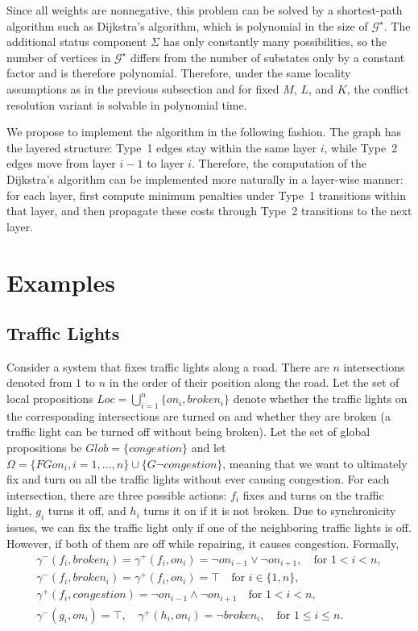 \documentclass[]{jair}
\begin{document}
Since all weights are nonnegative, this problem can be solved by a shortest-path
algorithm such as Dijkstra's algorithm, which is polynomial in the size of $\mathcal{G}^{\star}$. 
The additional status component $\Sigma$ has only constantly many possibilities, so the number of vertices in $\mathcal{G}^{\star}$ differs from the number of substates only by a constant factor and is therefore polynomial.
Therefore, under the same locality assumptions as in the previous subsection and for fixed $M$, $L$, and
$K$, the conflict resolution variant is solvable in polynomial time.

We propose to implement the algorithm in the following fashion.
The graph has the layered structure: Type~1 edges stay within the same layer $i$, while Type~2 edges move
from layer $i-1$ to layer $i$. Therefore, the computation of the Dijkstra's algorithm can be implemented more
naturally in a layer-wise manner: for each layer, first compute minimum penalties under
Type~1 transitions within that layer, and then propagate these costs through Type~2 transitions
to the next layer.

\section{Examples}\label{example}

\subsection{Traffic Lights}\label{ex1}

Consider a system that fixes traffic lights along a road. There are $n$ intersections denoted from $1$ to $n$ in the order of their position along the road. Let the set of local propositions
$Loc=\bigcup_{i=1}^n\{on_i, broken_i\}$ denote whether the traffic lights on the corresponding
intersections are turned on and whether they are broken (a traffic light can be turned off without being broken). Let the set of global propositions be $Glob=\{congestion\}$ and let $\Omega=\{FGon_i, i=1,\dots,n\}\cup\{G\neg congestion\}$, meaning that we want to ultimately
fix and turn on all the traffic lights without ever causing congestion. For each intersection, there are three possible actions: $f_i$ fixes and turns on the traffic light, $g_i$ turns it off, and $h_i$ turns it on if it is not broken. Due to synchronicity issues, we can fix the traffic light only if one of the neighboring traffic lights is off. However, if both of them are off while repairing, it causes congestion. Formally,
\begin{multline}\gamma^-(f_i, broken_i)=\gamma^+(f_i, on_i)=\neg on_{i-1}\lor \neg on_{i+1}, \quad \textrm{for } 1<i<n, \\
\gamma^-(f_i, broken_i)=\gamma^+(f_i, on_i)=\top \quad\textrm{for } i\in\{1,n\},\\
\gamma^+(f_i, congestion)=\neg on_{i-1}\land \neg on_{i+1}\quad \textrm{for } 1<i<n,\\
\gamma^-(g_i, on_i)=\top,\quad \gamma^+(h_i, on_i)=\neg broken_i,\quad \textrm{for } 1\le i\le n.
\end{multline}
\end{document}
